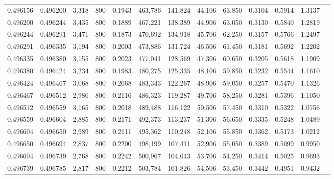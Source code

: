 \begin{tabular}{rrrrrrrrrrrrr}
0.496156 & 0.496200 &  3,318 &   800 &                                     0.1943 & 463,786 & 141,824 &  44,106 &  63,850 & 0.3104 & 0.5914 & 1.3137 \\
0.496200 & 0.496244 &  3,435 &   800 &                                     0.1889 & 467,221 & 138,389 &  44,906 &  63,050 & 0.3130 & 0.5840 & 1.2819 \\
0.496244 & 0.496291 &  3,471 &   800 &                                     0.1873 & 470,692 & 134,918 &  45,706 &  62,250 & 0.3157 & 0.5766 & 1.2497 \\
0.496291 & 0.496335 &  3,194 &   800 &                                     0.2003 & 473,886 & 131,724 &  46,506 &  61,450 & 0.3181 & 0.5692 & 1.2202 \\
0.496335 & 0.496380 &  3,155 &   800 &                                     0.2023 & 477,041 & 128,569 &  47,306 &  60,650 & 0.3205 & 0.5618 & 1.1909 \\
0.496380 & 0.496424 &  3,234 &   800 &                                     0.1983 & 480,275 & 125,335 &  48,106 &  59,850 & 0.3232 & 0.5544 & 1.1610 \\
0.496424 & 0.496467 &  3,068 &   800 &                                     0.2068 & 483,343 & 122,267 &  48,906 &  59,050 & 0.3257 & 0.5470 & 1.1326 \\
0.496467 & 0.496512 &  2,980 &   800 &                                     0.2116 & 486,323 & 119,287 &  49,706 &  58,250 & 0.3281 & 0.5396 & 1.1050 \\
0.496512 & 0.496559 &  3,165 &   800 &                                     0.2018 & 489,488 & 116,122 &  50,506 &  57,450 & 0.3310 & 0.5322 & 1.0756 \\
0.496559 & 0.496604 &  2,885 &   800 &                                     0.2171 & 492,373 & 113,237 &  51,306 &  56,650 & 0.3335 & 0.5248 & 1.0489 \\
0.496604 & 0.496650 &  2,989 &   800 &                                     0.2111 & 495,362 & 110,248 &  52,106 &  55,850 & 0.3362 & 0.5173 & 1.0212 \\
0.496650 & 0.496694 &  2,837 &   800 &                                     0.2200 & 498,199 & 107,411 &  52,906 &  55,050 & 0.3389 & 0.5099 & 0.9950 \\
0.496694 & 0.496739 &  2,768 &   800 &                                     0.2242 & 500,967 & 104,643 &  53,706 &  54,250 & 0.3414 & 0.5025 & 0.9693 \\
0.496739 & 0.496785 &  2,817 &   800 &                                     0.2212 & 503,784 & 101,826 &  54,506 &  53,450 & 0.3442 & 0.4951 & 0.9432 \\

\end{tabular}
